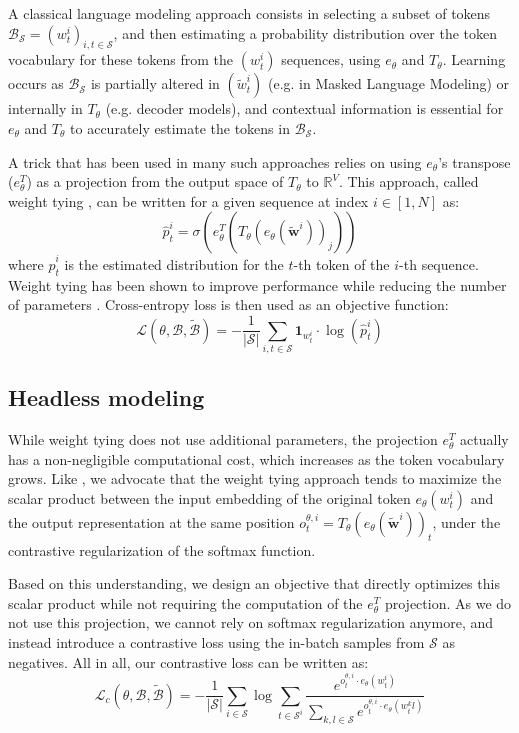 A classical language modeling approach consists in selecting a subset of tokens $\mathcal{B}_\mathcal{S} = (w^i_t)_{i,t \in \mathcal{S}}$, and then estimating a probability distribution over the token vocabulary for these tokens from the $(w^i_t)$ sequences, using $e_\theta$ and $T_\theta$. Learning occurs as $\mathcal{B}_\mathcal{S}$ is partially altered in $(\tilde{w}^i_t)$ (e.g. in Masked Language Modeling) or internally in $T_\theta$ (e.g. decoder models), and contextual information is essential for $e_\theta$ and $T_\theta$ to accurately estimate the tokens in $\mathcal{B}_\mathcal{S}$.

A trick that has been used in many such approaches relies on using $e_\theta$'s transpose ($e_\theta^T$) as a projection from the output space of $T_\theta$ to $\mathbb{R}^V$. This approach, called weight tying \citep{press-wolf-2017-using}, can be written for a given sequence at index $i \in [1, N]$ as:
$$
\hat{p}^i_t = \sigma \left( e_\theta^T \left(T_\theta \left( e_\theta \left(\widetilde{\mathbf{w}}^i\right) \right)_j\right) \right)
$$
where $\hat{p}^i_t$ is the estimated distribution for the $t$-th token of the $i$-th sequence. Weight tying has been shown to improve performance while reducing the number of parameters \citep{electra}. Cross-entropy loss is then used as an objective function:
$$
\mathcal{L}(\theta, \mathcal{B}, \tilde{\mathcal{B}}) = - \frac{1}{|\mathcal{S}|}\sum_{i,t \in \mathcal{S}} \mathbf{1}_{w^i_t} \cdot \log(\hat{p}^i_t)
$$

\subsection{Headless modeling}

While weight tying does not use additional parameters, the projection $e_\theta^T$ actually has a non-negligible computational cost, which increases as the token vocabulary grows. Like \citet{gao2018representation}, we advocate that the weight tying approach tends to maximize the scalar product between the input embedding of the original token $e_\theta(w^i_t)$ and the output representation at the same position $o^{\theta, i}_t = T_\theta(e_\theta(\tilde{\mathbf{w}}^{i}))_t$, under the contrastive regularization of the softmax function.

Based on this understanding, we design an objective that directly optimizes this scalar product while not requiring the computation of the $e_\theta^T$ projection. As we do not use this projection, we cannot rely on softmax regularization anymore, and instead introduce a contrastive loss using the in-batch samples from $\mathcal{S}$ as negatives. All in all, our contrastive loss can be written as:
$$
\mathcal{L}_c(\theta, \mathcal{B}, \tilde{\mathcal{B}}) = - \frac{1}{|\mathcal{S}|} \sum_{i \in \mathcal{S}} \log \sum_{t \in \mathcal{S}^i} \frac{e^{o^{\theta, i}_t \cdot e_\theta(w^i_t)}}{\sum_{k,l \in \mathcal{S}} e^{o^{\theta, i}_t \cdot e_\theta(w^k_tl)}}
$$

